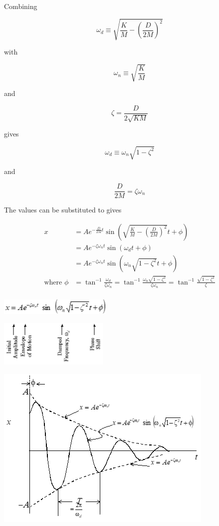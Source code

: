\documentclass[
]{book}
\begin{document}
Combining

\[
\omega_d \equiv \sqrt{\frac{K}{M} - \left(\frac{D}{2M} \right)^2}
\]

with

\[
\omega_n \equiv \sqrt{\frac{K}{M}}
\]

and

\[
\zeta = \frac{D}{ 2 \sqrt{KM} }
\]

gives

\[
\omega_d \equiv \omega_n \sqrt{1 - \zeta^2}
\]

and

\[
\frac{D}{2M} = \zeta \omega_n
\]

The values can be substituted to gives

\[
\begin{align}
x &= A e^{-\frac{D}{2M} t} \sin \left( \sqrt{\frac{K}{M} - \left(\frac{D}{2M} \right)^2} t + \phi  \right) \\
&= A e^{-\zeta \omega_n t} \sin \left( \omega_d t + \phi  \right) \\
&= A e^{-\zeta \omega_n t} \sin \left( \omega_n \sqrt{1 - \zeta^2} t + \phi  \right) \\
\text{where } \phi &= \tan^{-1} \frac{\omega_d}{\zeta \omega_n} =  \tan^{-1} \frac{\omega_n \sqrt{1 - \zeta^2}}{\zeta \omega_n} =  \tan^{-1} \frac{\sqrt{1 - \zeta^2}}{\zeta} \\
\end{align}
\]

\includegraphics{media/08/image43.png}

\includegraphics{media/08/image44.png}

\includegraphics{media/08/image45.png}
\end{document}
